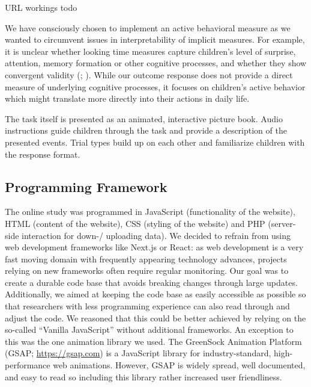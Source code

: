 \documentclass[
]{scrbook}
\begin{document}
URL workings todo

We have consciously chosen to implement an active behavioral measure as we wanted to circumvent issues in interpretability of implicit measures. For example, it is unclear whether looking time measures capture children's level of surprise, attention, memory formation or other cognitive processes, and whether they show convergent validity (; ). While our outcome response does not provide a direct measure of underlying cognitive processes, it focuses on children's active behavior which might translate more directly into their actions in daily life.

The task itself is presented as an animated, interactive picture book. Audio instructions guide children through the task and provide a description of the presented events. Trial types build up on each other and familiarize children with the response format.

\subsection{Programming Framework}\label{programmingframework}

The online study was programmed in JavaScript (functionality of the website), HTML (content of the website), CSS (styling of the website) and PHP (server-side interaction for down-/ uploading data). We decided to refrain from using web development frameworks like Next.js or React: as web development is a very fast moving domain with frequently appearing technology advances, projects relying on new frameworks often require regular monitoring. Our goal was to create a durable code base that avoids breaking changes through large updates. Additionally, we aimed at keeping the code base as easily accessible as possible so that researchers with less programming experience can also read through and adjust the code. We reasoned that this could be better achieved by relying on the so-called ``Vanilla JavaScript'' without additional frameworks. An exception to this was the one animation library we used. The GreenSock Animation Platform (GSAP; \mbox{\url{https://gsap.com}}) is a JavaScript library for industry-standard, high-performance web animations. However, GSAP is widely spread, well documented, and easy to read so including this library rather increased user friendliness.
\end{document}
